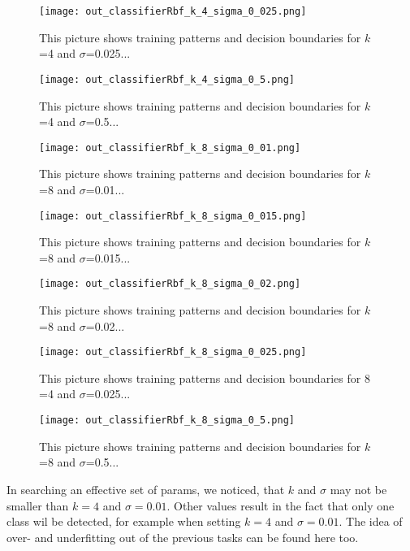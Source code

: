 \documentclass[a4paper,headings=small]{scrartcl}
\begin{document}
\begin{figure}[htbp]
\centering
\texttt{[image: out\_classifierRbf\_k\_4\_sigma\_0\_025.png]}
\caption{This picture shows training patterns and decision boundaries for $k$=4 and $\sigma$=0.025...}
\label{fig:out_classifierRbf_k_4_sigma_0.025}
\end{figure}

\begin{figure}[htbp]
\centering
\texttt{[image: out\_classifierRbf\_k\_4\_sigma\_0\_5.png]}
\caption{This picture shows training patterns and decision boundaries for $k$=4 and $\sigma$=0.5...}
\label{fig:out_classifierRbf_k_4_sigma_0.5}
\end{figure}


\begin{figure}[htbp]
\centering
\texttt{[image: out\_classifierRbf\_k\_8\_sigma\_0\_01.png]}
\caption{This picture shows training patterns and decision boundaries for $k$=8 and $\sigma$=0.01...}
\label{fig:out_classifierRbf_k_8_sigma_0.01}
\end{figure}

\begin{figure}[htbp]
\centering
\texttt{[image: out\_classifierRbf\_k\_8\_sigma\_0\_015.png]}
\caption{This picture shows training patterns and decision boundaries for $k$=8 and $\sigma$=0.015...}
\label{fig:out_classifierRbf_k_8_sigma_0.015}
\end{figure}

\begin{figure}[htbp]
\centering
\texttt{[image: out\_classifierRbf\_k\_8\_sigma\_0\_02.png]}
\caption{This picture shows training patterns and decision boundaries for $k$=8 and $\sigma$=0.02...}
\label{fig:out_classifierRbf_k_8_sigma_0.02}
\end{figure}

\begin{figure}[htbp]
\centering
\texttt{[image: out\_classifierRbf\_k\_8\_sigma\_0\_025.png]}
\caption{This picture shows training patterns and decision boundaries for $8$=4 and $\sigma$=0.025...}
\label{fig:out_classifierRbf_k_8_sigma_0.025}
\end{figure}

\begin{figure}[htbp]
\centering
\texttt{[image: out\_classifierRbf\_k\_8\_sigma\_0\_5.png]}
\caption{This picture shows training patterns and decision boundaries for $k$=8 and $\sigma$=0.5...}
\label{fig:out_classifierRbf_k_8_sigma_0.5}
\end{figure}

In searching an effective set of params, we noticed, that $k$ and $\sigma$ may not be smaller than $k=4$ and $\sigma = 0.01$.
Other values result in the fact that only one class wil be detected,
for example when setting $k = 4$ and $\sigma = 0.01$.
The idea of over- and underfitting out of the previous tasks can be found here too.
\end{document}
